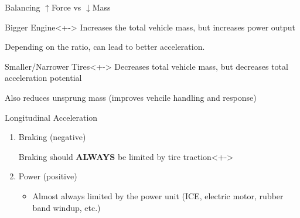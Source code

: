 \documentclass[aspectratio=169]{beamer}
\begin{document}
\begin{frame}{Balancing \(\uparrow\)Force vs \(\downarrow\)Mass}
    \begin{exampleblock}{Bigger Engine}<+->
        Increases the total vehicle mass, but increases power output

        Depending on the ratio, can lead to better acceleration.
    \end{exampleblock}

    \vspace{10pt}
    \begin{exampleblock}{Smaller/Narrower Tires}<+->
        Decreases total vehicle mass, but decreases total acceleration potential

        Also reduces unsprung mass (improves vehcile handling and response)
    \end{exampleblock}
\end{frame}

\begin{frame}{Longitudinal Acceleration}

    \begin{enumerate}
        \item<+-> Braking (negative)
            \begin{alertblock}{Braking should \textbf{ALWAYS} be limited by tire traction}<+->
                \begin{itemize}
                \end{itemize}
            \end{alertblock}
        \item<+-> Power (positive)
        \begin{itemize}
            \item<+-> Almost always limited by the power unit (ICE, electric motor, rubber band windup, etc.)
        \end{itemize}
    \end{enumerate}
\end{frame}
\end{document}

